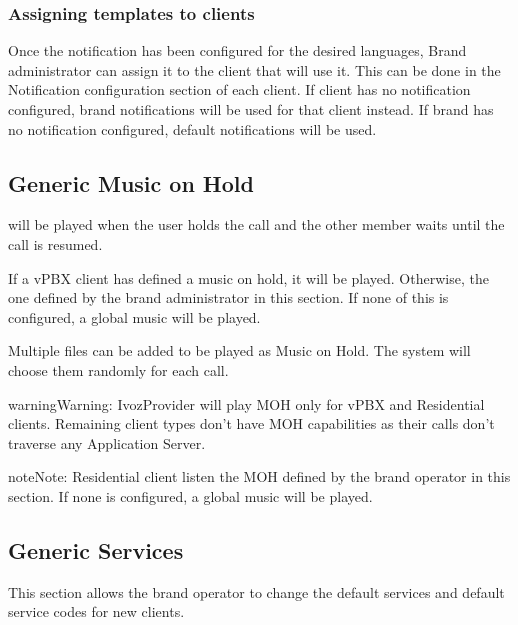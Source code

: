 \documentclass[letterpaper,10pt,english]{sphinxmanual}
\begin{document}
\subsubsection{Assigning templates to clients}
\label{administration_portal/brand/settings/notification_templates:assigning-templates-to-clients}
Once the notification has been configured for the desired languages, Brand administrator can assign it to the
client that will use it. This can be done in the Notification configuration section of each client.
If client has no notification configured, brand notifications will be used for that client instead. If brand has no
notification configured, default notifications will be used.


\subsection{Generic Music on Hold}
\label{administration_portal/brand/settings/generic_music_on_hold:generic-music-on-hold}\label{administration_portal/brand/settings/generic_music_on_hold::doc}
{\hyperref[administration_portal/client/vpbx/multimedia/music_on_hold:music\string-on\string-hold]{}} will be played when the user holds the call and the other
member waits until the call is resumed.

If a vPBX client has defined a music on hold, it will be played. Otherwise, the
one defined by the brand administrator in this section. If none of this is configured,
a global music will be played.

Multiple files can be added to be played as Music on Hold. The system will choose them randomly for each call.

\begin{notice}{warning}{Warning:}
IvozProvider will play MOH only for vPBX and Residential clients. Remaining client
types don't have MOH capabilities as their calls don't traverse any Application Server.
\end{notice}

\begin{notice}{note}{Note:}
Residential client listen the MOH defined by the brand operator in this section. If none is configured,
a global music will be played.
\end{notice}


\subsection{Generic Services}
\label{administration_portal/brand/settings/generic_services:generic-services}\label{administration_portal/brand/settings/generic_services::doc}\label{administration_portal/brand/settings/generic_services:brand-services}
This section allows the brand operator to change the default services and default service codes for new clients.
\end{document}
